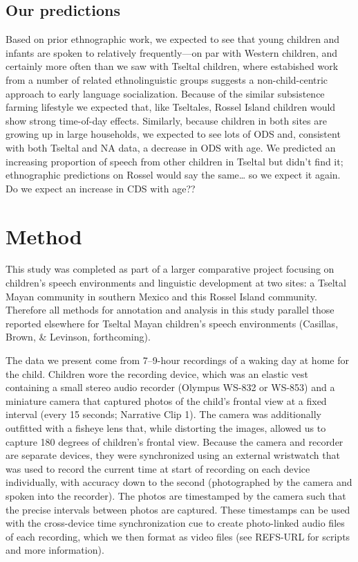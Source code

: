 \documentclass[,man,floatsintext]{apa6}
\begin{document}
\subsection{Our predictions}\label{our-predictions}

Based on prior ethnographic work, we expected to see that young children
and infants are spoken to relatively frequently---on par with Western
children, and certainly more often than we saw with Tseltal children,
where estabished work from a number of related ethnolinguistic groups
suggests a non-child-centric approach to early language socialization.
Because of the similar subsistence farming lifestyle we expected that,
like Tseltales, Rossel Island children would show strong time-of-day
effects. Similarly, because children in both sites are growing up in
large households, we expected to see lots of ODS and, consistent with
both Tseltal and NA data, a decrease in ODS with age. We predicted an
increasing proportion of speech from other children in Tseltal but
didn't find it; ethnographic predictions on Rossel would say the
same\ldots{} so we expect it again. Do we expect an increase in CDS with
age??

\section{Method}\label{method}

This study was completed as part of a larger comparative project
focusing on children's speech environments and linguistic development at
two sites: a Tseltal Mayan community in southern Mexico and this Rossel
Island community. Therefore all methods for annotation and analysis in
this study parallel those reported elsewhere for Tseltal Mayan
children's speech environments (Casillas, Brown, \& Levinson,
forthcoming).

The data we present come from 7--9-hour recordings of a waking day at
home for the child. Children wore the recording device, which was an
elastic vest containing a small stereo audio recorder (Olympus WS-832 or
WS-853) and a miniature camera that captured photos of the child's
frontal view at a fixed interval (every 15 seconds; Narrative Clip 1).
The camera was additionally outfitted with a fisheye lens that, while
distorting the images, allowed us to capture 180 degrees of children's
frontal view. Because the camera and recorder are separate devices, they
were synchronized using an external wristwatch that was used to record
the current time at start of recording on each device individually, with
accuracy down to the second (photographed by the camera and spoken into
the recorder). The photos are timestamped by the camera such that the
precise intervals between photos are captured. These timestamps can be
used with the cross-device time synchronization cue to create
photo-linked audio files of each recording, which we then format as
video files (see REFS-URL for scripts and more information).
\end{document}
